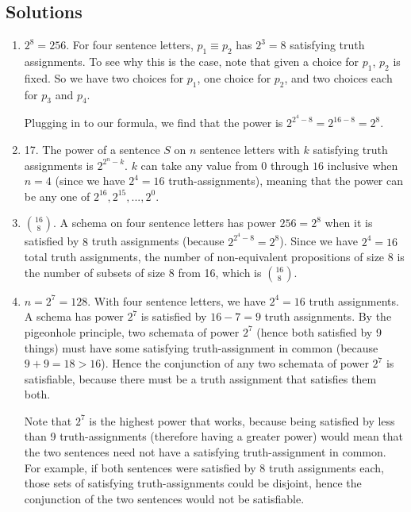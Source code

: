 \newpage
\begin{mdframed}[linewidth=1]
\section*{Solutions}
\begin{enumerate}
    \item $2^8 = 256$. For four sentence letters, $p_1 \equiv p_2$ has $2^3 = 8$ satisfying truth assignments. To see why this is the case, note that given a choice for $p_1$, $p_2$ is fixed. So we have two choices for $p_1$, one choice for $p_2$, and two choices each for $p_3$ and $p_4$.

    Plugging in to our formula, we find that the power is $2^{2^4 - 8} = 2^{16 - 8} = 2^8$. 

    \item 17. The power of a sentence $S$ on $n$ sentence letters with $k$ satisfying truth assignments is $2^{2^n - k}$. $k$ can take any value from $0$ through $16$ inclusive when $n = 4$ (since we have $2^4 = 16$ truth-assignments), meaning that the power can be any one of $2^{16}, 2^{15}, ... , 2^0$.

    \item $\binom{16}{8}$. A schema on four sentence letters has power $256 = 2^8$ when it is satisfied by $8$ truth assignments (because $2^{2^4 - 8} = 2^8$). Since we have $2^4 = 16$ total truth assignments, the number of non-equivalent propositions of size 8 is the number of subsets of size 8 from 16, which is $\binom{16}{8}$. 

    \item $n = 2^7 = 128$. With four sentence letters, we have $2^4 = 16$ truth assignments. A schema has power $2^7$ is satisfied by $16 - 7 = 9$ truth assignments. By the pigeonhole principle, two schemata of power $2^7$ (hence both satisfied by 9 things) must have some satisfying truth-assignment in common (because $9 + 9 = 18 > 16$). Hence the conjunction of any two schemata of power $2^7$ is satisfiable, because there must be a truth assignment that satisfies them both. 

    Note that $2^7$ is the highest power that works, because being satisfied by less than 9 truth-assignments (therefore having a greater power) would mean that the two sentences need not have a satisfying truth-assignment in common. For example, if both sentences were satisfied by 8 truth assignments each, those sets of satisfying truth-assignments could be disjoint, hence the conjunction of the two sentences would not be satisfiable. 


\end{enumerate}
\end{mdframed}
